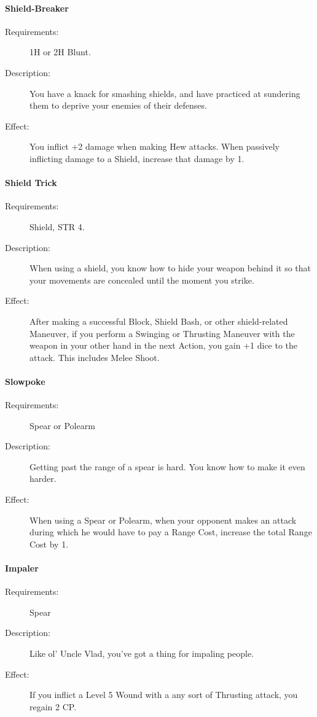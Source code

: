 \documentclass[oneside,11pt,english]{book}
\begin{document}
\paragraph{\label{talent:Shield-Breaker}Shield-Breaker}
	\begin{description}
		\item [Requirements:] 1H or 2H Blunt. 
		\item [Description:] You have a knack for smashing shields, and have practiced at sundering them to deprive 
your enemies of their defenses. 
		\item [Effect:] You inflict +2 damage when making Hew attacks. When passively inflicting damage to a Shield, 
increase that damage by 1. 

	\end{description}
\paragraph{\label{talent:Shield Trick}Shield Trick}
	\begin{description}
		\item [Requirements:] Shield, STR 4. 
		\item [Description:] When using a shield, you know how to hide your weapon behind it so that your movements 
are concealed until the moment you strike. 
		\item [Effect:] After making a successful Block, Shield Bash, or other shield-related Maneuver, if you perform a 
Swinging or Thrusting Maneuver with the weapon in your other hand in the next Action, you gain +1 dice 
to the attack. This includes Melee Shoot.

	\end{description}
\paragraph{\label{talent:Slowpoke}Slowpoke}
	\begin{description}
		\item [Requirements:] Spear or Polearm 
		\item [Description:] Getting past the range of a spear is hard. You know how to make it even harder.
		\item [Effect:] When using a Spear or Polearm, when your opponent makes an attack during which he would 
have to pay a Range Cost, increase the total Range Cost by 1. 

	\end{description}
\paragraph{\label{talent:Impaler}Impaler}
	\begin{description}
		\item [Requirements:] Spear 
		\item [Description:] Like ol’ Uncle Vlad, you’ve got a thing for impaling people. 
		\item [Effect:] If you inflict a Level 5 Wound with a any sort of Thrusting attack, you regain 2 CP. 

	\end{description}
\end{document}
